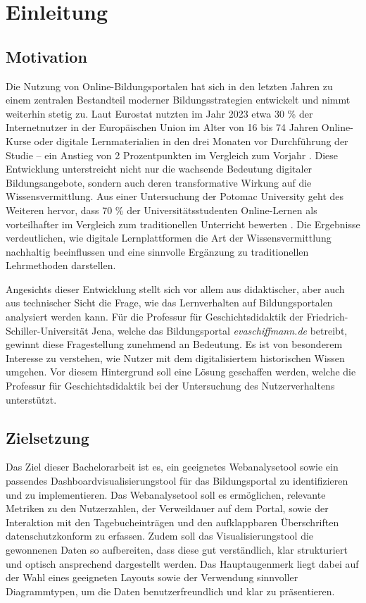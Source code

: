\chapter{Einleitung}
\label{ch:einleitung}

\section{Motivation}
\label{sec:motivation}

Die Nutzung von Online-Bildungsportalen hat sich in den letzten Jahren zu einem zentralen Bestandteil moderner Bildungsstrategien entwickelt und nimmt weiterhin stetig zu. Laut Eurostat nutzten im Jahr 2023 etwa 30 \% der Internetnutzer in der Europäischen Union im Alter von 16 bis 74 Jahren Online-Kurse oder digitale Lernmaterialien
in den drei Monaten vor Durchführung der Studie – ein Anstieg von 2 Prozentpunkten im Vergleich zum Vorjahr \parencite{Eurostat}. Diese Entwicklung unterstreicht nicht nur die wachsende Bedeutung digitaler Bildungsangebote, sondern auch deren transformative Wirkung auf die Wissensvermittlung. Aus einer Untersuchung der Potomac University geht des Weiteren hervor, dass 70 \% der Universitätsstudenten Online-Lernen als vorteilhafter im Vergleich zum traditionellen Unterricht bewerten \parencite{Potomac}. Die Ergebnisse verdeutlichen, wie digitale Lernplattformen die Art der Wissensvermittlung nachhaltig beeinflussen und eine sinnvolle Ergänzung zu traditionellen Lehrmethoden darstellen.

Angesichts dieser Entwicklung stellt sich vor allem aus didaktischer, aber auch aus technischer Sicht die Frage, wie das Lernverhalten auf Bildungsportalen analysiert werden kann. Für die Professur für Geschichtsdidaktik der Friedrich-Schiller-Universität Jena, welche das Bildungsportal \textit{evaschiffmann.de} betreibt, gewinnt diese Fragestellung zunehmend an Bedeutung. Es ist von besonderem Interesse zu verstehen, wie Nutzer mit dem digitalisiertem historischen Wissen umgehen. Vor diesem Hintergrund soll eine Lösung geschaffen werden, welche die Professur für Geschichtsdidaktik bei der Untersuchung des Nutzerverhaltens unterstützt.

\section{Zielsetzung}
\label{sec:zielsetzung}

Das Ziel dieser Bachelorarbeit ist es, ein geeignetes Webanalysetool sowie ein passendes Dashboardvisualisierungstool für das Bildungsportal zu identifizieren und zu implementieren. Das Webanalysetool soll es ermöglichen, relevante Metriken zu den Nutzerzahlen, der Verweildauer auf dem Portal, sowie der Interaktion mit den Tagebucheinträgen und den aufklappbaren Überschriften datenschutzkonform zu erfassen. Zudem soll das Visualisierungstool die gewonnenen Daten so aufbereiten, dass diese gut verständlich, klar strukturiert und optisch ansprechend dargestellt werden. Das Hauptaugenmerk liegt dabei auf der Wahl eines geeigneten Layouts sowie der Verwendung sinnvoller Diagrammtypen, um die Daten benutzerfreundlich und klar zu präsentieren.

